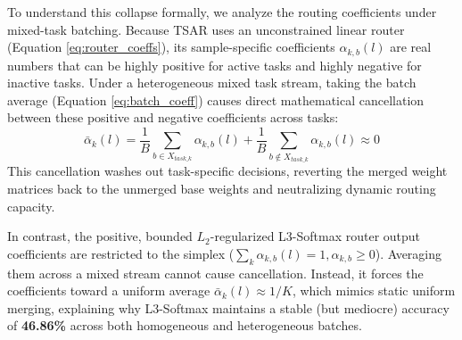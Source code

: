 To understand this collapse formally, we analyze the routing coefficients under mixed-task
batching. Because TSAR uses an unconstrained linear router (Equation \ref{eq:router_coeffs}), its
sample-specific coefficients $\alpha_{k, b}(l)$ are real numbers that can be highly positive for
active tasks and highly negative for inactive tasks. Under a heterogeneous mixed task stream, taking
the batch average (Equation \ref{eq:batch_coeff}) causes direct mathematical cancellation between
these positive and negative coefficients across tasks:
\begin{equation}
\bar{\alpha}_k(l) = \frac{1}{B} \sum_{b \in X_{task\_k}} \alpha_{k, b}(l) + \frac{1}{B} \sum_{b \notin X_{task\_k}} \alpha_{k, b}(l) \approx 0
\label{eq:coefficient_cancel}
\end{equation}
This cancellation washes out task-specific decisions, reverting the merged weight matrices back to
the unmerged base weights and neutralizing dynamic routing capacity. 

In contrast, the positive, bounded $L_2$-regularized L3-Softmax router output coefficients are
restricted to the simplex ($\sum_k \alpha_{k, b}(l) = 1, \alpha_{k, b} \ge 0$). Averaging them
across a mixed stream cannot cause cancellation. Instead, it forces the coefficients toward a
uniform average $\bar{\alpha}_k(l) \approx 1/K$, which mimics static uniform merging, explaining why
L3-Softmax maintains a stable (but mediocre) accuracy of \textbf{46.86\%} across both homogeneous
and heterogeneous batches. 

